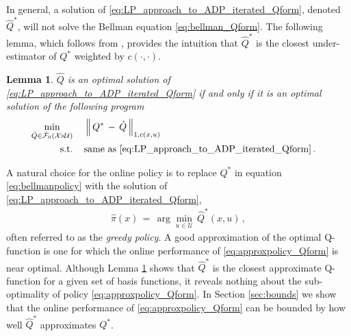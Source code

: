 \documentclass[journal]{IEEEtran}
\newtheorem{lemma}[theorem]{Lemma}
\newcommand{\mcal}{\mathcal}
\newcommand{\subjto}{\text{s.t.}}
\newcommand{\textQ}{Q}
\newcommand{\approxFuncSpaceXUindex}[1]{\smash{\hat{\mcal{F}}_{#1}(\mcal{X} \!\times\! \mcal{U})}}
\begin{document}
In general, a solution of \eqref{eq:LP_approach_to_ADP_iterated_Qform}, denoted $\hat{Q}^\ast$, will not solve the Bellman equation \eqref{eq:bellman_Qform}.
The following lemma, which follows from \cite[Lemma 1]{vanRoy_linApproxDP}, provides the intuition that $\hat{Q}^\ast$ is the closest under-estimator of $Q^\ast$ weighted by $c(\cdot,\cdot)$.

\vspace{0.1cm}

\begin{lemma} \label{lemma:approxLP_for_Q_solves_min_1norm}
	$\hat{Q}$ is an optimal solution of \eqref{eq:LP_approach_to_ADP_iterated_Qform} if and only if it is an optimal solution of the following program
		\begin{equation} \label{eq:LP_approach_to_ADP_iterated_Qform_1norm}
		\begin{aligned}
			\hspace{-0.35cm}
			\min_{\hat{Q} \in \approxFuncSpaceXUindex{0}}
				\,&\quad \left\| \, Q^\ast \,-\, \hat{Q} \, \right\|_{1,c(x,u)}
			\\
			\subjto
				\,&\quad \text{same as \eqref{eq:LP_approach_to_ADP_iterated_Qform}}
				\,.
		\end{aligned}
	\end{equation}
\end{lemma}




A natural choice for the online policy is to replace $Q^\ast$ in equation \eqref{eq:bellmanpolicy} with the solution of \eqref{eq:LP_approach_to_ADP_iterated_Qform},
	\begin{equation} \label{eq:approxpolicy_Qform}
		\begin{aligned}
			\hat{\pi}(x)
				\,=\, \arg\min_{u\in\mcal{U}} \, \hat{Q}^\ast(x,u)
				\,,
		\end{aligned}
	\end{equation}
often referred to as the \emph{greedy policy}.
A good approximation of the optimal \textQ-function is one for which the online performance of \eqref{eq:approxpolicy_Qform} is near optimal. Although Lemma \ref{lemma:approxLP_for_Q_solves_min_1norm} shows that $\hat{Q}^\ast$ is the closest approximate \textQ-function for a given set of basis functions, it reveals nothing about the sub-optimality of policy \eqref{eq:approxpolicy_Qform}. In Section \ref{sec:bounds} we show that the online performance of \eqref{eq:approxpolicy_Qform} can be bounded by how well $\hat{Q}^\ast$ approximates $Q^\ast$.
\end{document}
